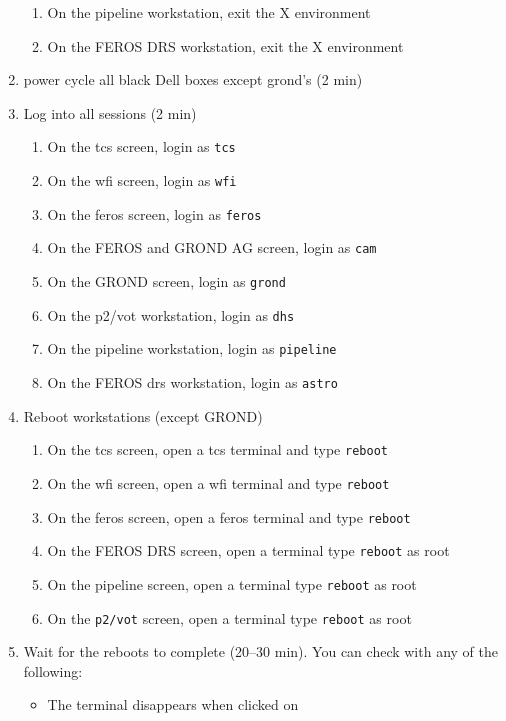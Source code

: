 \documentclass[11pt,fleqn,a4paper]{book}
\begin{document}
\begin{enumerate}
\begin{enumerate}
        \item On the pipeline workstation, exit the X environment
        \item On the FEROS DRS workstation, exit the X environment
    \end{enumerate}
\item \label{list:soft:power}\Gls{power cycle} all black Dell boxes except \gls{grond}'s (2 min) 
\item Log into all sessions (2 min)
\begin{enumerate}
    \item On the \gls{tcs} screen, login as \texttt{tcs}
    \item On the \gls{wfi} screen, login as \texttt{wfi}
    \item On the \gls{feros} screen, login as \texttt{feros}
    \item On the FEROS and GROND AG screen, login as \texttt{cam}
    \item On the GROND screen, login as \texttt{grond}
    \item On the \gls{p2}/\gls{vot} workstation, login as \texttt{dhs}
    \item On the pipeline workstation, login as \texttt{pipeline}
    \item On the FEROS \gls{drs} workstation, login as \texttt{astro}
\end{enumerate}
\item Reboot workstations (except GROND)
\begin{enumerate}
    \item On the \gls{tcs} screen, open a tcs terminal and type \texttt{reboot}
    \item On the \gls{wfi} screen, open a wfi terminal and type \texttt{reboot} 
    \item On the \gls{feros} screen, open a feros terminal and type \texttt{reboot}
    \item On the FEROS DRS screen, open a terminal type \texttt{reboot} as root
    \item On the pipeline screen, open a terminal type \texttt{reboot} as root
    \item On the \texttt{p2/vot} screen, open a terminal type \texttt{reboot} as root
\end{enumerate}
\item Wait for the reboots to complete (20--30 min). You can check with any of the following:
    \begin{itemize}
        \item The terminal disappears when clicked on

\end{itemize}
\end{enumerate}
\end{document}
